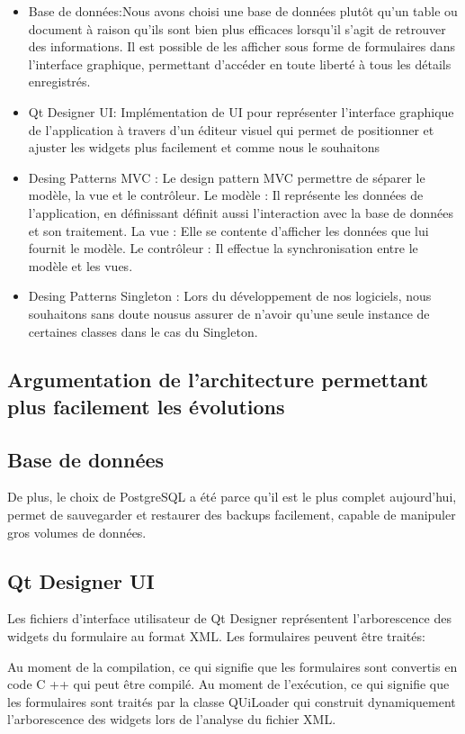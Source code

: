 \documentclass[10pt,a4paper,openany]{report}
\begin{document}
	\begin{itemize}
		\item Base de données:Nous avons choisi une base de données plutôt qu'un table ou document à raison qu'ils sont bien plus efficaces lorsqu'il s'agit de retrouver des informations. Il est possible de les afficher sous forme de formulaires dans l'interface graphique, permettant d'accéder en toute liberté à tous les détails enregistrés.
		\item Qt Designer UI: Implémentation de UI pour représenter l'interface graphique de l'application à travers d'un éditeur visuel qui permet de positionner et ajuster les widgets plus facilement et comme nous le souhaitons
		\item Desing Patterns MVC : 
		Le design pattern MVC permettre de séparer le modèle, la vue et le contrôleur.
		Le modèle : Il représente les données de l'application, en définissant définit aussi l'interaction avec la base de données et son traitement.
		La vue : Elle se contente d'afficher les données que lui fournit le modèle.
		Le contrôleur : Il effectue la synchronisation entre le modèle et les vues.
		\item Desing Patterns Singleton : Lors du développement de nos logiciels, nous souhaitons sans doute nousus assurer de n'avoir qu'une seule instance de certaines classes dans le cas du Singleton. 
	\end{itemize}
	
	
	\subsection{Argumentation de l'architecture permettant plus facilement les évolutions}
	
	\subsection{Base de données}	
	 De plus, le choix de PostgreSQL a été parce qu'il est le plus complet aujourd'hui, permet de sauvegarder et restaurer des backups facilement, capable de manipuler gros volumes de données.
	
	\subsection{Qt Designer UI}
	Les fichiers d'interface utilisateur de Qt Designer représentent l'arborescence des widgets du formulaire au format XML. Les formulaires peuvent être traités:
	
	Au moment de la compilation, ce qui signifie que les formulaires sont convertis en code C ++ qui peut être compilé.
	Au moment de l'exécution, ce qui signifie que les formulaires sont traités par la classe QUiLoader qui construit dynamiquement l'arborescence des widgets lors de l'analyse du fichier XML.
	
\end{document}
